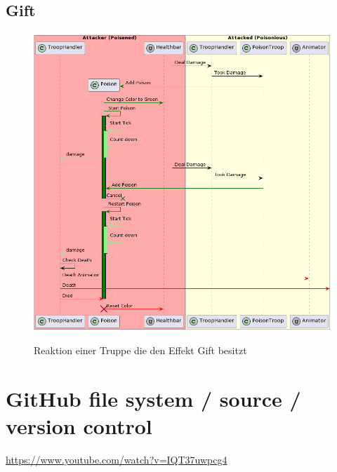 \subsection{Gift}
\begin{figure}[H]
    \centering
    \includegraphics[width=15cm]{resources/Poison.png} \\
    \caption{Reaktion einer Truppe die den Effekt Gift besitzt}
\end{figure}



    \section{GitHub file system / source / version control}
\url{https://www.youtube.com/watch?v=IQT37uwpcg4}